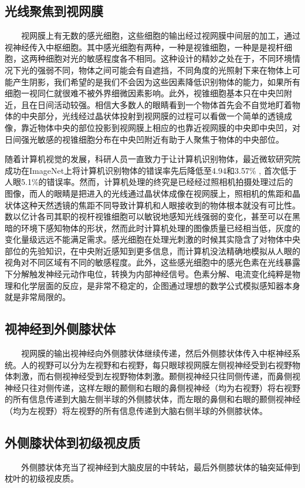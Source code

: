 \documentclass{article}
\begin{document}
\begin{spacing}{1.0}
\subsection{光线聚焦到视网膜}
\ \ \ \	视网膜上有无数的感光细胞，这些细胞的输出经过视网膜中间层的加工，通过视神经传入中枢细胞。其中感光细胞有两种，一种是视锥细胞，一种是是视杆细胞，这两种细胞对光的敏感程度各不相同。这种设计的精妙之处在于，不同环境情况下光的强弱不同，物体之间可能会有自遮挡，不同角度的光照射下来在物体上可能产生阴影，我们希望的是我们不会因为这些因素降低识别物体的能力，如果所有细胞一视同仁就很难不被外界细微因素影响。此外，视锥细胞基本只在中央凹附近，且在日间活动较强。相信大多数人的眼睛看到一个物体首先会不自觉地盯着物体的中央部分，光线经过晶状体投射到视网膜的过程可以看做一个简单的透镜成像，靠近物体中央的部位投影到视网膜上相应的也靠近视网膜的中央即中央凹，对日间强光敏感的视锥细胞分布在中央凹附近有助于人聚焦于物体的中央部位。\par 
	随着计算机视觉的发展，科研人员一直致力于让计算机识别物体，最近微软研究院成功在ImageNet上将计算机识别物体的错误率先后降低至4.94\cite{delving}和3.57\% \cite{deep}, 首次低于人眼5.1\%的错误率。然而，计算机处理的终究是已经经过照相机拍摄处理过后的图像，而人的眼睛是把进入的光线通过晶状体成像在视网膜上，照相机的焦距和晶状体这种天然透镜的焦距不同导致计算机和人眼接收到的物体根本就没有可比性。数以亿计各司其职的视杆视锥细胞可以敏锐地感知光线强弱的变化，甚至可以在黑暗的环境下感知物体的形状，然而此时计算机处理的图像质量已经相当低，灰度的变化量级远远不能满足需求。感光细胞在处理光刺激的时候其实隐含了对物体中央部位的先验知识，在中央附近感知到更多信息，而计算机没法精确地模拟从人眼的视角对不同区域有不同的敏感程度。此外，这些感光细胞中的感光色素在光线暴露下分解触发神经元动作电位，转换为内部神经信号。色素分解、电流变化纯粹是物理和化学层面的反应，是非常不稳定的，企图通过理想的数学公式模拟感知器本身就是非常局限的。
\subsection{视神经到外侧膝状体}
\ \ \ \ 视网膜的输出视神经向外侧膝状体继续传递，然后外侧膝状体传入中枢神经系统。人的视野可以分为左视野和右视野，每只眼球视网膜左侧视神经受到右视野物体刺激，而右侧视神经受到左视野物体刺激。颞侧视神经只往同侧传递，而鼻侧视神经只往对侧传递，这样左眼的颞侧和右眼的鼻侧视神经（均为右视野）将右视野的所有信息传递到大脑左侧半球的外侧膝状体，而左眼的鼻侧和右眼的颞侧视神经（均为左视野）将左视野的所有信息传递到大脑右侧半球的外侧膝状体。
\subsection{外侧膝状体到初级视皮质}
\ \ \ \ 外侧膝状体充当了视神经到大脑皮层的中转站，最后外侧膝状体的轴突延伸到枕叶的初级视皮质。

\end{spacing}
\end{document}
